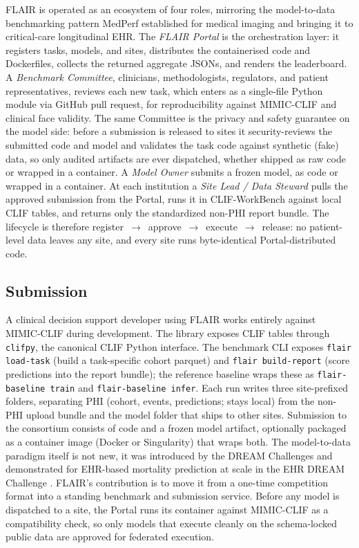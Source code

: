 FLAIR is operated as an ecosystem of four roles, mirroring the
model-to-data benchmarking pattern MedPerf established for medical
imaging \citep{karargyris2023medperf} and bringing it to critical-care
longitudinal EHR. The \emph{FLAIR Portal} is the orchestration layer: it
registers tasks, models, and sites, distributes the containerised code
and Dockerfiles, collects the returned aggregate JSONs, and renders the
leaderboard. A \emph{Benchmark Committee}, clinicians, methodologists,
regulators, and patient representatives, reviews each new task, which
enters as a single-file Python module via GitHub pull request, for
reproducibility against MIMIC-CLIF and clinical face validity. The same
Committee is the privacy and safety guarantee on the model side: before a
submission is released to sites it security-reviews the submitted code and
model and validates the task code against synthetic (fake) data, so only
audited artifacts are ever dispatched, whether shipped as raw code or
wrapped in a container. A \emph{Model Owner} submits a frozen model, as
code or wrapped in a container. At each institution a \emph{Site Lead / Data
Steward} pulls the approved submission from the Portal, runs it in
CLIF-WorkBench against local CLIF tables, and returns only the
standardized non-PHI report bundle. The lifecycle is therefore
register~$\rightarrow$~approve~$\rightarrow$~execute~$\rightarrow$~release:
no patient-level data leaves any site, and every site runs byte-identical
Portal-distributed code.

\subsection*{Submission}

A clinical decision support developer using FLAIR works entirely
against MIMIC-CLIF during development. The library exposes CLIF tables
through \texttt{clifpy}, the canonical CLIF Python interface. The
benchmark CLI exposes \texttt{flair load-task} (build a task-specific
cohort parquet) and \texttt{flair build-report} (score predictions into
the report bundle); the reference baseline wraps these as
\texttt{flair-baseline train} and \texttt{flair-baseline infer}. Each
run writes three site-prefixed folders, separating PHI (cohort, events,
predictions; stays local) from the non-PHI upload bundle and the model
folder that ships to other sites. Submission to the consortium consists
of code and a frozen model artifact, optionally packaged as a container
image (Docker or Singularity) that wraps both. The model-to-data paradigm
itself is not new, it was introduced by the DREAM Challenges
\citep{guinney2018dream} and demonstrated for EHR-based mortality
prediction at scale in the EHR DREAM Challenge
\citep{bergquist2024ehrdream}. FLAIR's contribution is to move it from
a one-time competition format into a standing benchmark and submission
service. Before any model is dispatched to a site, the Portal runs its
container against MIMIC-CLIF as a compatibility check, so only models
that execute cleanly on the schema-locked public data are approved for
federated execution.

